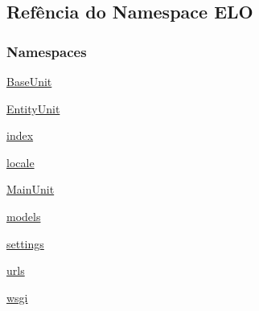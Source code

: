 \hypertarget{namespaceELO}{\subsection{Refência do Namespace E\-L\-O}
\label{namespaceELO}
}
\subsubsection*{Namespaces}
\begin{DoxyCompactItemize}
\item 
\hyperlink{namespaceELO_1_1BaseUnit}{Base\-Unit}
\item 
\hyperlink{namespaceELO_1_1EntityUnit}{Entity\-Unit}
\item 
\hyperlink{namespaceELO_1_1index}{index}
\item 
\hyperlink{namespaceELO_1_1locale}{locale}
\item 
\hyperlink{namespaceELO_1_1MainUnit}{Main\-Unit}
\item 
\hyperlink{namespaceELO_1_1models}{models}
\item 
\hyperlink{namespaceELO_1_1settings}{settings}
\item 
\hyperlink{namespaceELO_1_1urls}{urls}
\item 
\hyperlink{namespaceELO_1_1wsgi}{wsgi}
\end{DoxyCompactItemize}
